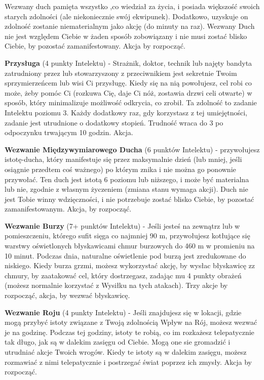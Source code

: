 Wezwany duch pamięta wszystko ,co wiedział za życia, i posiada większość swoich starych zdolności (ale niekoniecznie swój ekwipunek). Dodatkowo, uzyskuje on zdolność zostanie niematerialnym jako akcję (do minuty na raz). Wezwany Duch nie jest względem Ciebie w żaden sposób zobowiązany i nie musi zostać blisko Ciebie, by pozostać zamanifestowany. Akcja by rozpocząć. 

\textbf{Przysługa}\label{sec:Przysługa} (4 punkty Intelektu) - Strażnik, doktor, technik lub najęty bandyta zatrudniony przez lub stowarzyszony z przeciwnikiem jest sekretnie Twoim sprzymierzeńcem lub wisi Ci przysługę. Kiedy się na nią powołujesz, cel robi co może, żeby pomóc Ci (rozkuwa Cię, daje Ci nóż, zostawia drzwi celi otwarte) w sposób, który minimalizuje możliwość odkrycia, co zrobił. Ta zdolność to zadanie Intelektu poziomu 3. Każdy dodatkowy raz, gdy korzystasz z tej umiejętności, zadanie jest utrudnione o dodatkowy stopień. Trudność wraca do 3 po odpoczynku trwającym 10 godzin. Akcja.

\textbf{Wezwanie Międzywymiarowego Ducha}\label{sec:Wezwanie Międzywymiarowego Ducha} (6 punktów Intelektu) - przywołujesz istotę-ducha, który manifestuje się przez maksymalnie dzień (lub mniej, jeśli osiągnie przedtem coś ważnego) po którym znika i nie można go ponownie przywołać. Ten duch jest istotą 6 poziomu lub niższego, i może być materialna lub nie, zgodnie z własnym życzeniem (zmiana stanu wymaga akcji). Duch nie jest Tobie winny wdzięczności, i nie potrzebuje zostać blisko Ciebie, by pozostać zamanifestowanym. Akcja, by rozpocząć.

\textbf{Wezwanie Burzy}\label{sec:Wezwanie Burzy} (7+ punktów Intelektu) - Jeśli jesteś na zewnątrz lub w pomieszczeniu, którego sufit sięga co najmniej 90 m, przywołujesz kotłujące się warstwy oświetlonych błyskawicami chmur burzowych do 460 m w promieniu na 10 minut. Podczas dnia, naturalne oświetlenie pod burzą jest zredukowane do niskiego. Kiedy burza grzmi, możesz wykorzystać akcję, by wysłac błyskawicę zz chmury, by zaatakować cel, który dostrzegasz, zadając mu 4 punkty obrażeń (możesz normalnie korzystać z Wysiłku na tych atakach). Trzy akcje by rozpocząć, akcja, by wezwać błyskawicę. 

\textbf{Wezwanie Roju}\label{sec:Wezwanie Roju} (4 punkty Intelektu) - Jeśli znajdujesz się w lokacji, gdzie mogą przybyć istoty związane z Twoją zdolnością Wpływ na Rój, możesz wezwać je na godzinę. Podczas tej godziny, istoty te robią, co im rozkażesz telepatycznie tak długo, jak są w dalekim zasięgu od Ciebie. Mogą one sie gromadzić i utrudniać akcje Twoich wrogów. Kiedy te istoty są w dalekim zasięgu, możesz rozmawiać z nimi telepatycznie i postrzegać świat poprzez ich zmysły. Akcja by rozpocząć. 

